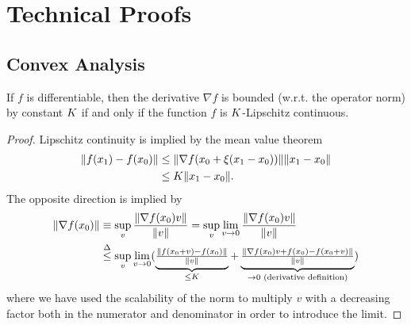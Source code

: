
\chapter{Technical Proofs}

\section{Convex Analysis}

\begin{lemma}\label{Appdx-lem: lipschitz and bounded derivative}
	If \(f\) is differentiable, then the derivative \(\nabla f\) is
	bounded (w.r.t. the operator norm) by constant \(K\) if and only if the function
	\(f\) is \(K\)-Lipschitz continuous.
\end{lemma}
\begin{proof}
	Lipschitz continuity is implied by the mean value theorem
	\begin{align*}
		\|f(x_1) - f(x_0)\|
		&\le \|\nabla f(x_0 + \xi(x_1-x_0))\| \|x_1- x_0\|\\
		&\le K \|x_1-x_0\|.
	\end{align*}
	The opposite direction is implied by
	\begin{align*}
		\|\nabla f(x_0)\|
		&\equiv \sup_{v} \frac{\|\nabla f(x_0)v\|}{\|v\|}
		= \sup_{v} \lim_{v\to 0}\frac{\|\nabla f(x_0)v\|}{\|v\|}\\
		&\lxle{\Delta}\sup_{v} \lim_{v\to 0}
		(
			\underbrace{
				\tfrac{\|f(x_0 + v) - f(x_0) \|}{\|v\|}
			}_{
				\le \lipConst 
			}
			+ \underbrace{
				\tfrac{\|\nabla f(x_0)v + f(x_0) - f(x_0 +v)\|}{\|v\|}
			}_{
				\to 0 \text{ (derivative definition)}
			}
		)
	\end{align*}
	where we have used the scalability of the norm to multiply \(v\) with a
	decreasing factor both in the numerator and denominator in order to introduce
	the limit.
\end{proof}

